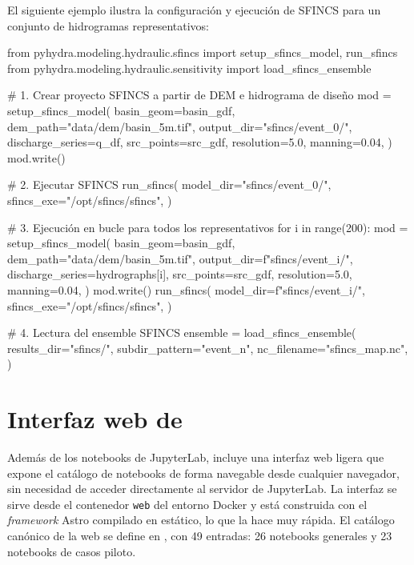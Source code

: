 El siguiente ejemplo ilustra la configuración y ejecución de SFINCS para un conjunto de hidrogramas representativos:

{\footnotesize
\begin{codeblock}
from pyhydra.modeling.hydraulic.sfincs import setup_sfincs_model, run_sfincs
from pyhydra.modeling.hydraulic.sensitivity import load_sfincs_ensemble

# 1. Crear proyecto SFINCS a partir de DEM e hidrograma de diseño
mod = setup_sfincs_model(
    basin_geom=basin_gdf,
    dem_path="data/dem/basin_5m.tif",
    output_dir="sfincs/event_0/",
    discharge_series=q_df,
    src_points=src_gdf,
    resolution=5.0,
    manning=0.04,
)
mod.write()

# 2. Ejecutar SFINCS
run_sfincs(
    model_dir="sfincs/event_0/",
    sfincs_exe="/opt/sfincs/sfincs",
)

# 3. Ejecución en bucle para todos los representativos
for i in range(200):
    mod = setup_sfincs_model(
        basin_geom=basin_gdf,
        dem_path="data/dem/basin_5m.tif",
        output_dir=f"sfincs/event_{i}/",
        discharge_series=hydrographs[i],
        src_points=src_gdf,
        resolution=5.0,
        manning=0.04,
    )
    mod.write()
    run_sfincs(
        model_dir=f"sfincs/event_{i}/",
        sfincs_exe="/opt/sfincs/sfincs",
    )

# 4. Lectura del ensemble SFINCS
ensemble = load_sfincs_ensemble(
    results_dir="sfincs/",
    subdir_pattern="event_{n}",
    nc_filename="sfincs_map.nc",
)
\end{codeblock}
}

\section{Interfaz web de \hydra}
\label{sec:interfaz_web}

Además de los notebooks de JupyterLab, \hydra incluye una interfaz web ligera que expone el catálogo de notebooks de forma navegable desde cualquier navegador, sin necesidad de acceder directamente al servidor de JupyterLab. La interfaz se sirve desde el contenedor \texttt{web} del entorno Docker y está construida con el \emph{framework} Astro compilado en estático, lo que la hace muy rápida. El catálogo canónico de la web se define en , con 49 entradas: 26 notebooks generales y 23 notebooks de casos piloto.

